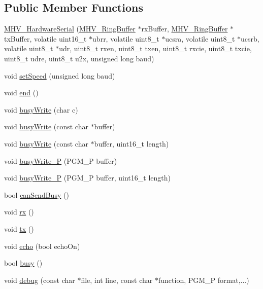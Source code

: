 \subsection*{\-Public \-Member \-Functions}
\begin{DoxyCompactItemize}
\item 
\hyperlink{class_m_h_v___hardware_serial_ac1a95bdefa81bae650979c7053901133}{\-M\-H\-V\-\_\-\-Hardware\-Serial} (\hyperlink{class_m_h_v___ring_buffer}{\-M\-H\-V\-\_\-\-Ring\-Buffer} $\ast$rx\-Buffer, \hyperlink{class_m_h_v___ring_buffer}{\-M\-H\-V\-\_\-\-Ring\-Buffer} $\ast$tx\-Buffer, volatile uint16\-\_\-t $\ast$ubrr, volatile uint8\-\_\-t $\ast$ucsra, volatile uint8\-\_\-t $\ast$ucsrb, volatile uint8\-\_\-t $\ast$udr, uint8\-\_\-t rxen, uint8\-\_\-t txen, uint8\-\_\-t rxcie, uint8\-\_\-t txcie, uint8\-\_\-t udre, uint8\-\_\-t u2x, unsigned long baud)
\item 
void \hyperlink{class_m_h_v___hardware_serial_af8d170e311447db775b308a3ba882b91}{set\-Speed} (unsigned long baud)
\item 
void \hyperlink{class_m_h_v___hardware_serial_a1cc98a306711c95770df293def48dd9b}{end} ()
\item 
void \hyperlink{class_m_h_v___hardware_serial_aa4c2fa65afae88e4d3854a35955705ee}{busy\-Write} (char c)
\item 
void \hyperlink{class_m_h_v___hardware_serial_acc533901bc41d333e48a93b75bf9a15d}{busy\-Write} (const char $\ast$buffer)
\item 
void \hyperlink{class_m_h_v___hardware_serial_aca9542f5ed2b7ba04f5398fccf8da262}{busy\-Write} (const char $\ast$buffer, uint16\-\_\-t length)
\item 
void \hyperlink{class_m_h_v___hardware_serial_aef0e7d7d7866c39a1cd5d2ef8c9bdbd2}{busy\-Write\-\_\-\-P} (\-P\-G\-M\-\_\-\-P buffer)
\item 
void \hyperlink{class_m_h_v___hardware_serial_a6a2371b9509e27893a6c238fc9a046a8}{busy\-Write\-\_\-\-P} (\-P\-G\-M\-\_\-\-P buffer, uint16\-\_\-t length)
\item 
bool \hyperlink{class_m_h_v___hardware_serial_a650ce0799c3dbefb7170fc1875449e5a}{can\-Send\-Busy} ()
\item 
void \hyperlink{class_m_h_v___hardware_serial_aab993847fb6369e666495000d94196a3}{rx} ()
\item 
void \hyperlink{class_m_h_v___hardware_serial_a3674578dc6dce3ca7d32d6f3df9cd49f}{tx} ()
\item 
void \hyperlink{class_m_h_v___hardware_serial_a815b6e92f32457c55c2808701f315ff2}{echo} (bool echo\-On)
\item 
bool \hyperlink{class_m_h_v___hardware_serial_a8ea82d7e9d6958604ff94a55f331e9d5}{busy} ()
\item 
void \hyperlink{class_m_h_v___hardware_serial_aa6f5253788861521668da888c9844594}{debug} (const char $\ast$file, int line, const char $\ast$function, \-P\-G\-M\-\_\-\-P format,...)
\end{DoxyCompactItemize}
